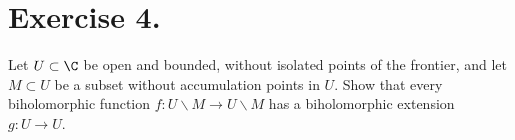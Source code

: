 \section*{Exercise 4.}

Let $U \subset \C$ be open and bounded, without isolated points of the frontier, and let $M \subset U$ be a subset without accumulation points in $U$. Show that every biholomorphic function $f: U \backslash M \to U \backslash M$ has a biholomorphic extension $g: U \to U$.